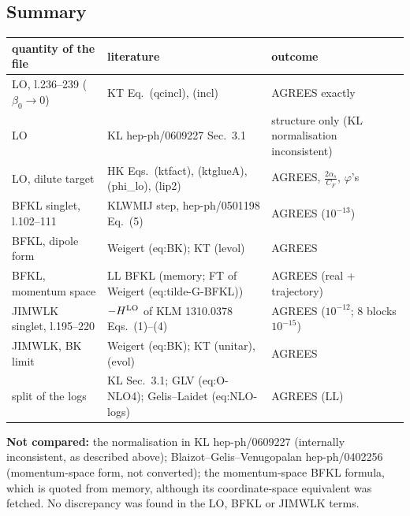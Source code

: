 \subsection{Summary}
\begin{center}
\begin{tabular}{p{}p{}p{}}
quantity of the file & literature & outcome\\\hline
LO, l.236--239 ($\beta_0\to0$) & KT Eq.~(qcincl), (incl) & AGREES exactly\\
LO & KL hep-ph/0609227 Sec.~3.1 & structure only (KL normalisation inconsistent)\\
LO, dilute target & HK Eqs.~(ktfact), (ktglueA), (phi\_lo), (lip2) & AGREES, $\frac{2\alpha_s}{C_F}$, $\varphi$'s\\
BFKL singlet, l.102--111 & KLWMIJ step, hep-ph/0501198 Eq.~(5) & AGREES ($10^{-13}$)\\
BFKL, dipole form & Weigert (eq:BK); KT (levol) & AGREES\\
BFKL, momentum space & LL BFKL (memory; FT of Weigert (eq:tilde-G-BFKL)) & AGREES (real + trajectory)\\
JIMWLK singlet, l.195--220 & $-H^{\rm LO}$ of KLM 1310.0378 Eqs.~(1)--(4) & AGREES ($10^{-12}$; 8 blocks $10^{-15}$)\\
JIMWLK, BK limit & Weigert (eq:BK); KT (unitar), (evol) & AGREES\\
split of the logs & KL Sec.~3.1; GLV (eq:O-NLO4); Gelis--Laidet (eq:NLO-logs) & AGREES (LL)
\end{tabular}
\end{center}
\noindent\textbf{Not compared:} the normalisation in KL hep-ph/0609227 (internally inconsistent, as described above); Blaizot--Gelis--Venugopalan hep-ph/0402256 (momentum-space form, not converted); the momentum-space BFKL formula, which is quoted from memory, although its coordinate-space equivalent was fetched. No discrepancy was found in the LO, BFKL or JIMWLK terms.
